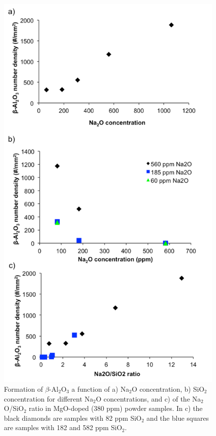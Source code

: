 \newpage
\begin{figure}[H]
	\centering
	\includegraphics[scale=0.90]{Chapter-5/Figures/Figure3.png}
	\caption{Formation of $\beta$-Al$_{2}$O$_{3}$ a function of a) Na$_{2}$O concentration, b) SiO$_{2}$ concentration for different Na$_{2}$O concentrations, and c) of the Na$_{2}$O/SiO$_{2}$ ratio in MgO-doped (380 ppm) powder samples. In c) the black diamonds are samples with 82 ppm SiO$_{2}$ and the blue squares are samples with 182 and 582 ppm SiO$_{2}$.}
	\label{Ch5-figure:Figure3}
\end{figure}

